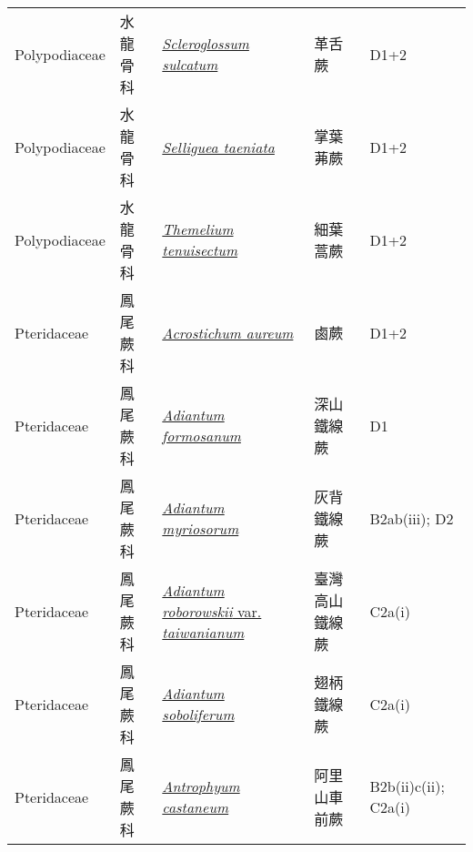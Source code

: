 {\begin{longtable}{p{2.5cm}p{2cm}p{5cm}p{2.5cm}p{3cm}}
    Polypodiaceae & 水龍骨科 & \href{http://www.theplantlist.org/tpl1.1/search?q=Scleroglossum+sulcatum}{\textit{Scleroglossum sulcatum} } & 革舌蕨 & D1+2 \index{Scleroglossum@\textit{Scleroglossum}!sulcatum@\textit{sulcatum}}  \index{革舌蕨} \\
    Polypodiaceae & 水龍骨科 & \href{http://www.theplantlist.org/tpl1.1/search?q=Selliguea+taeniata}{\textit{Selliguea taeniata} } & 掌葉茀蕨 & D1+2 \index{Selliguea@\textit{Selliguea}!taeniata@\textit{taeniata}}  \index{掌葉茀蕨} \\
    Polypodiaceae & 水龍骨科 & \href{http://www.theplantlist.org/tpl1.1/search?q=Themelium+tenuisectum}{\textit{Themelium tenuisectum} } & 細葉蒿蕨 & D1+2 \index{Themelium@\textit{Themelium}!tenuisectum@\textit{tenuisectum}}  \index{細葉蒿蕨} \\
    Pteridaceae & 鳳尾蕨科 & \href{http://www.theplantlist.org/tpl1.1/search?q=Acrostichum+aureum}{\textit{Acrostichum aureum} } & 鹵蕨 & D1+2 \index{Acrostichum@\textit{Acrostichum}!aureum@\textit{aureum}}  \index{鹵蕨} \\
    Pteridaceae & 鳳尾蕨科 & \href{http://www.theplantlist.org/tpl1.1/search?q=Adiantum+formosanum}{\textit{Adiantum formosanum} } & 深山鐵線蕨 & D1 \index{Adiantum@\textit{Adiantum}!formosanum@\textit{formosanum}}  \index{深山鐵線蕨} \\
    Pteridaceae & 鳳尾蕨科 & \href{http://www.theplantlist.org/tpl1.1/search?q=Adiantum+myriosorum}{\textit{Adiantum myriosorum} } & 灰背鐵線蕨 & B2ab(iii); D2 \index{Adiantum@\textit{Adiantum}!myriosorum@\textit{myriosorum}}  \index{灰背鐵線蕨} \\
    Pteridaceae & 鳳尾蕨科 & \href{http://www.theplantlist.org/tpl1.1/search?q=Adiantum+roborowskii+var.+taiwanianum}{\textit{Adiantum roborowskii} var. \textit{taiwanianum} } & 臺灣高山鐵線蕨 & C2a(i) \index{Adiantum@\textit{Adiantum}!roborowskii@\textit{roborowskii}!var. taiwanianum@var. \textit{taiwanianum}}  \index{臺灣高山鐵線蕨} \\
    Pteridaceae & 鳳尾蕨科 & \href{http://www.theplantlist.org/tpl1.1/search?q=Adiantum+soboliferum}{\textit{Adiantum soboliferum} } & 翅柄鐵線蕨 & C2a(i) \index{Adiantum@\textit{Adiantum}!soboliferum@\textit{soboliferum}}  \index{翅柄鐵線蕨} \\
    Pteridaceae & 鳳尾蕨科 & \href{http://www.theplantlist.org/tpl1.1/search?q=Antrophyum+castaneum}{\textit{Antrophyum castaneum} } & 阿里山車前蕨 & B2b(ii)c(ii); C2a(i) \index{Antrophyum@\textit{Antrophyum}!castaneum@\textit{castaneum}}  \index{阿里山車前蕨} \\

\end{longtable}}
